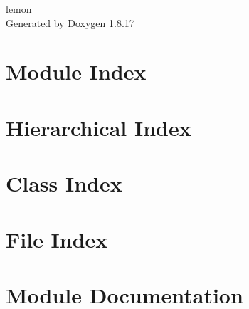 \let\mypdfximage\pdfximage\def\pdfximage{\immediate\mypdfximage}\documentclass[twoside]{book}
\newcommand{\+}{\discretionary{\mbox{\scriptsize$\hookleftarrow$}}{}{}}
\newcommand{\clearemptydoublepage}{%
  \newpage{\pagestyle{empty}\cleardoublepage}%
}
\begin{document}
\hypersetup{pageanchor=false,
             bookmarksnumbered=true,
             pdfencoding=unicode
            }
\begin{titlepage}
\vspace*{7cm}
\begin{center}%
{\Large lemon }\\
\vspace*{1cm}
{\large Generated by Doxygen 1.8.17}\\
\end{center}
\end{titlepage}
\clearemptydoublepage
{}
\tableofcontents
\clearemptydoublepage
{}
\hypersetup{pageanchor=true}

\chapter{Module Index}

\chapter{Hierarchical Index}

\chapter{Class Index}

\chapter{File Index}

\chapter{Module Documentation}










\end{document}
